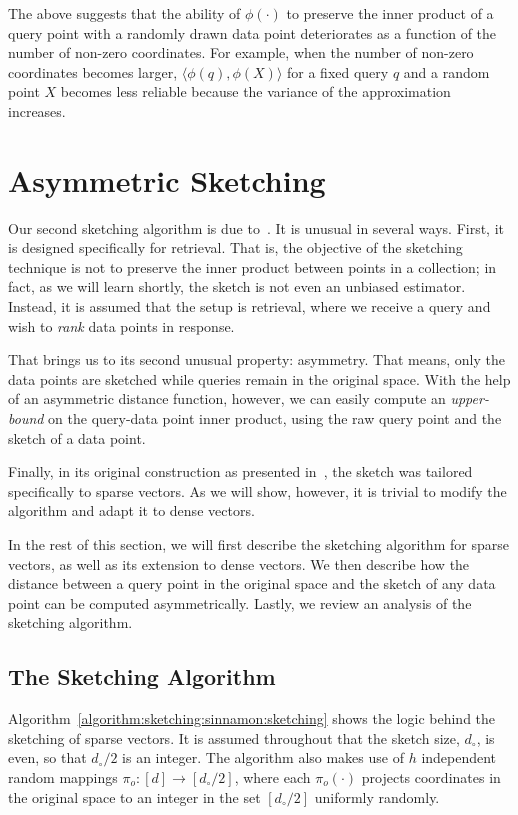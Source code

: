 The above suggests that the ability of $\phi(\cdot)$
to preserve the inner product of a query point with a randomly drawn
data point deteriorates as a function of the number of non-zero coordinates.
For example, when the number of non-zero coordinates becomes larger,
$\langle \phi(q), \phi(X) \rangle$ for a
fixed query $q$ and a random point $X$ becomes less reliable because
the variance of the approximation increases.


\section{Asymmetric Sketching}

Our second sketching algorithm is due to~\cite{bruch2023sinnamon}.
It is unusual in several ways. First, it is designed specifically for
retrieval. That is, the objective of the sketching technique is not
to preserve the inner product between points in a collection;
in fact, as we will learn shortly, the sketch is not even an unbiased estimator.
Instead, it is assumed that the setup is retrieval,
where we receive a query and wish to \emph{rank} data points in response.

That brings us to its second unusual property: asymmetry.
That means, only the data points are sketched while queries remain
in the original space. With the help of an asymmetric distance function,
however, we can easily compute an \emph{upper-bound} on the
query-data point inner product, using the raw query point and the sketch
of a data point.

Finally, in its original construction as presented in~\citep{bruch2023sinnamon},
the sketch was tailored specifically to sparse vectors.
As we will show, however, it is trivial to modify the algorithm and
adapt it to dense vectors.

In the rest of this section, we will first describe the sketching algorithm
for sparse vectors, as well as its extension to dense vectors.
We then describe how the distance between a query point in the original space
and the sketch of any data point can be computed asymmetrically.
Lastly, we review an analysis of the sketching algorithm.

\subsection{The Sketching Algorithm}

Algorithm~\ref{algorithm:sketching:sinnamon:sketching} shows the logic behind the sketching of sparse vectors.
It is assumed throughout that the sketch size, $d_\circ$, is even, so that $d_\circ/2$ is an integer.
The algorithm also makes use of $h$ independent random mappings
$\pi_o: [d] \rightarrow [d_\circ/2]$, where each $\pi_o(\cdot)$ projects
coordinates in the original space to an integer in the set $[d_\circ/2]$
uniformly randomly.

